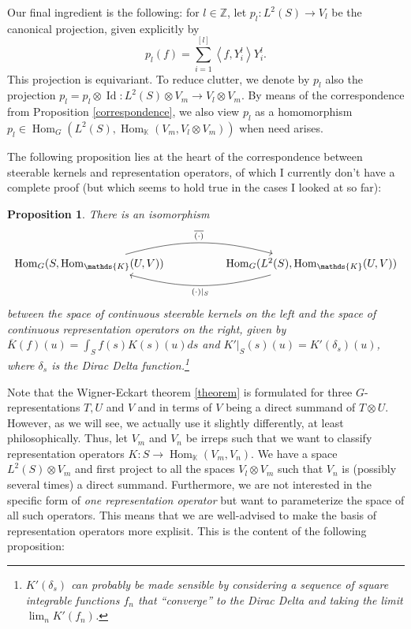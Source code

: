 \documentclass[12pt, a4paper]{article}
\theoremstyle{plain}
\newtheorem{pro}{Proposition}[section]
\theoremstyle{definition}
\theoremstyle{remark}
\newcommand{\Z}{\mathds{Z}}
\newcommand{\K}{\mathds{K}}
\DeclareMathOperator{\Hom}{Hom}
\DeclareMathOperator{\Id}{Id}
\begin{document}
Our final ingredient is the following: for $l \in \Z$, let $p_l: L^2(S) \to V_l$ be the canonical projection, given explicitly by
\begin{equation*}
p_l(f) = \sum_{i = 1}^{[l]} \left\langle  f, Y^l_i \right\rangle Y^l_i.
\end{equation*}
This projection is equivariant. To reduce clutter, we denote by $p_l$ also the projection $p_l = p_l \otimes \Id: L^2(S) \otimes V_m \to V_l \otimes V_m$. By means of the correspondence from Proposition \ref{correspondence}, we also view $p_l$ as a homomorphism $p_l \in \Hom_G(L^2(S), \Hom_\K(V_m, V_l \otimes V_m))$ when need arises.

The following proposition lies at the heart of the correspondence between steerable kernels and representation operators, of which I currently don't have a complete proof (but which seems to hold true in the cases I looked at so far):

\begin{pro}\label{steerable kernels = representation operators}
There is an isomorphism
\begin{equation*}
\begin{tikzcd}
\Hom_G(S, \Hom_{\K}(U, V)) \ar[rr, bend left = 15, "\overline{(\cdot)}"] & & \Hom_G(L^2(S), \Hom_{\K}(U, V)) \ar[ll, bend left = 15, "(\cdot)|_{S}"]
\end{tikzcd}
\end{equation*}
between the space of continuous steerable kernels on the left and the space of continuous representation operators on the right, given by $\overline{K}(f)(u) = \int_{S}f(s)K(s)(u)ds$ and $K'|_{S}(s)(u) = K'(\delta_s)(u)$, where $\delta_s$ is the Dirac Delta function.\footnote{$K'(\delta_s)$ can probably be made sensible by considering a sequence of square integrable functions $f_n$ that ``converge'' to the Dirac Delta and taking the limit $\lim_{n} K'(f_n)$.}
\end{pro}

Note that the Wigner-Eckart theorem \ref{theorem} is formulated for three $G$-representations $T, U$ and $V$ and in terms of $V$ being a direct summand of $T \otimes U$. However, as we will see, we actually use it slightly differently, at least philosophically. Thus, let $V_m$ and $V_n$ be irreps such that we want to classify representation operators $K: S \to \Hom_{\K}(V_m, V_n)$. We have a space $L^2(S) \otimes V_m$ and first project to all the spaces $V_l \otimes V_m$ such that $V_n$ is (possibly several times) a direct summand. Furthermore, we are not interested in the specific form of \emph{one representation operator} but want to parameterize the space of all such operators. This means that we are well-advised to make the basis of representation operators more explisit. This is the content of the following proposition:
\end{document}
